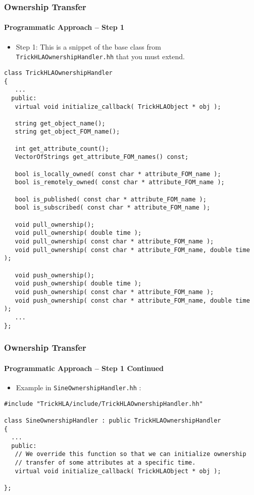    \begin{frame}[fragile]
      \frametitle{Ownership Transfer}
      \framesubtitle{Programmatic Approach – Step 1}
      \begin{itemize}
         \item Step 1: This is a snippet of the base class from
         \texttt{TrickHLAOwnershipHandler.hh} that you must extend. 
      \end{itemize}
\begin{Verbatim}[frame=single, fontsize=\Tiny]
class TrickHLAOwnershipHandler
{
   ...
  public:
   virtual void initialize_callback( TrickHLAObject * obj );

   string get_object_name();
   string get_object_FOM_name();

   int get_attribute_count();
   VectorOfStrings get_attribute_FOM_names() const;

   bool is_locally_owned( const char * attribute_FOM_name );
   bool is_remotely_owned( const char * attribute_FOM_name );

   bool is_published( const char * attribute_FOM_name );
   bool is_subscribed( const char * attribute_FOM_name );

   void pull_ownership();
   void pull_ownership( double time );
   void pull_ownership( const char * attribute_FOM_name );
   void pull_ownership( const char * attribute_FOM_name, double time );

   void push_ownership();
   void push_ownership( double time );
   void push_ownership( const char * attribute_FOM_name );
   void push_ownership( const char * attribute_FOM_name, double time );
   ...
};
\end{Verbatim}
   \end{frame}

   \begin{frame}[fragile]
      \frametitle{Ownership Transfer}
      \framesubtitle{Programmatic Approach – Step 1 Continued}
      \begin{itemize}
         \item Example in \texttt{SineOwnershipHandler.hh} : 
      \end{itemize}
\begin{Verbatim}[frame=single, fontsize=\footnotesize]
#include "TrickHLA/include/TrickHLAOwnershipHandler.hh"

class SineOwnershipHandler : public TrickHLAOwnershipHandler
{
  ...
  public:
   // We override this function so that we can initialize ownership
   // transfer of some attributes at a specific time.
   virtual void initialize_callback( TrickHLAObject * obj );

};
\end{Verbatim}
   \end{frame}

